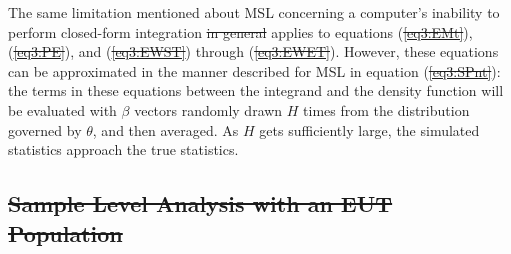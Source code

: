 \documentclass[11pt,a4paper]{article} %
\providecommand{\DIFaddtex}[1]{{\protect\color{blue}\uwave{#1}}} %
\providecommand{\DIFdeltex}[1]{{\protect\color{red}\sout{#1}}}                      %
\providecommand{\DIFaddbegin}{} %
\providecommand{\DIFaddend}{} %
\providecommand{\DIFdelbegin}{} %
\providecommand{\DIFdelend}{} %
\providecommand{\DIFadd}[1]{\texorpdfstring{\DIFaddtex{#1}}{#1}} %
\providecommand{\DIFdel}[1]{\texorpdfstring{\DIFdeltex{#1}}{}} %
\newcommand{\DIFscaledelfig}{0.5}
\newlength{\DIFdelgraphicswidth} %
\newlength{\DIFdelgraphicsheight} %
\newcommand{\DIFaddincludegraphics}[2][]{{\color{blue}\fbox{\DIFOincludegraphics[#1]{#2}}}} %
\newcommand{\DIFdelincludegraphics}[2][]{%
\sbox{\DIFdelgraphicsbox}{\DIFOincludegraphics[#1]{#2}}%
\settoboxwidth{\DIFdelgraphicswidth}{\DIFdelgraphicsbox} %
\settoboxtotalheight{\DIFdelgraphicsheight}{\DIFdelgraphicsbox} %
\scalebox{\DIFscaledelfig}{%
\parbox[b]{\DIFdelgraphicswidth}{\usebox{\DIFdelgraphicsbox}\\[-\baselineskip] \rule{\DIFdelgraphicswidth}{0em}}\llap{\resizebox{\DIFdelgraphicswidth}{\DIFdelgraphicsheight}{%
\setlength{\unitlength}{\DIFdelgraphicswidth}%
\begin{picture}(1,1)%
\thicklines\linethickness{2pt} %
{\color[rgb]{1,0,0}\put(0,0){\framebox(1,1){}}}%
{\color[rgb]{1,0,0}\put(0,0){\line( 1,1){1}}}%
{\color[rgb]{1,0,0}\put(0,1){\line(1,-1){1}}}%
\end{picture}%
}\hspace*{3pt}}} %
} %
\DeclareRobustCommand{\DIFaddbegin}{\DIFOaddbegin \let\includegraphics\DIFaddincludegraphics} %
\DeclareRobustCommand{\DIFaddend}{\DIFOaddend \let\includegraphics\DIFOincludegraphics} %
\DeclareRobustCommand{\DIFdelbegin}{\DIFOdelbegin \let\includegraphics\DIFdelincludegraphics} %
\DeclareRobustCommand{\DIFdelend}{\DIFOaddend \let\includegraphics\DIFOincludegraphics} %
\begin{document}
The same limitation mentioned about MSL concerning a computer's inability to perform closed-form integration \DIFdelbegin \DIFdel{in general }\DIFdelend applies to equations (\DIFdelbegin \DIFdel{\ref{eq3:EMt}}\DIFdelend \DIFaddbegin \DIFadd{\ref{eq:EMt}}\DIFaddend ), (\DIFdelbegin \DIFdel{\ref{eq3:PE}}\DIFdelend \DIFaddbegin \DIFadd{\ref{eq:PE}}\DIFaddend ), and (\DIFdelbegin \DIFdel{\ref{eq3:EWST}}\DIFdelend \DIFaddbegin \DIFadd{\ref{eq:EDWT}}\DIFaddend ) through (\DIFdelbegin \DIFdel{\ref{eq3:EWET}}\DIFdelend \DIFaddbegin \DIFadd{\ref{eq:EPWTe}}\DIFaddend ).
However, these equations can be approximated in the manner described for MSL in equation (\DIFdelbegin \DIFdel{\ref{eq3:SPnt}}\DIFdelend \DIFaddbegin \DIFadd{\ref{eq:SPnt}}\DIFaddend ): the terms in these equations between the integrand and the density function will be evaluated with $\beta$ vectors randomly drawn $H$ times from the distribution governed by $\theta$, and then averaged.
As $H$ gets sufficiently large, the simulated statistics approach the true statistics.

\DIFdelbegin \subsection{\DIFdel{Sample Level Analysis with an EUT Population}}
\addtocounter{subsection}{-1}%
\end{document}
